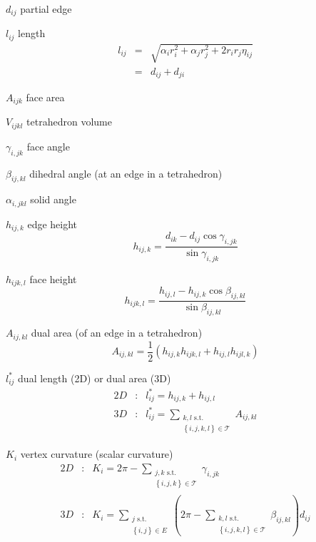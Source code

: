 \documentclass{article}
\begin{document}
$d_{ij}$ partial edge

$l_{ij}$ length%
\begin{eqnarray*}
l_{ij} &=&\sqrt{\alpha _{i}r_{i}^{2}+\alpha _{j}r_{j}^{2}+2r_{i}r_{j}\eta
_{ij}} \\
&=&d_{ij}+d_{ji}
\end{eqnarray*}

$A_{ijk}$ face area

$V_{ijkl}$ tetrahedron volume

$\gamma _{i,jk}$ face angle

$\beta _{ij,kl}$ dihedral angle (at an edge in a tetrahedron)

$\alpha _{i,jkl}$ solid angle

$h_{ij,k}$ edge height%
\begin{equation*}
h_{ij,k}=\frac{d_{ik}-d_{ij}\cos \gamma _{i,jk}}{\sin \gamma _{i,jk}} 
\end{equation*}

$h_{ijk,l}$ face height%
\begin{equation*}
h_{ijk,l}=\frac{h_{ij,l}-h_{ij,k}\cos \beta _{ij,kl}}{\sin \beta _{ij,kl}} 
\end{equation*}

$A_{ij,kl}$ dual area (of an edge in a tetrahedron)%
\begin{equation*}
A_{ij,kl}=\frac{1}{2}\left( h_{ij,k}h_{ijk,l}+h_{ij,l}h_{ijl,k}\right) 
\end{equation*}

$l_{ij}^{\ast }$ dual length (2D) or dual area (3D) 
\begin{eqnarray*}
2D &:&l_{ij}^{\ast }=h_{ij,k}+h_{ij,l} \\
3D &:&l_{ij}^{\ast }=\sum_{\substack{ k,l\text{ s.t.}  \\ \left\{
i,j,k,l\right\} \in \mathcal{T}}}A_{ij,kl}
\end{eqnarray*}

$K_{i}$ vertex curvature (scalar curvature)%
\begin{eqnarray*}
2D &:&K_{i}=2\pi -\sum_{\substack{ j,k\text{ s.t.}  \\ \left\{ i,j,k\right\}
\in \mathcal{T}}}\gamma _{i,jk} \\
3D &:&K_{i}=\sum_{\substack{ j\text{ s.t.}  \\ \left\{ i,j\right\} \in E}}%
\left( 2\pi -\sum_{\substack{ k,l\text{ s.t.}  \\ \left\{ i,j,k,l\right\}
\in \mathcal{T}}}\beta _{ij,kl}\right) d_{ij}
\end{eqnarray*}
\end{document}
